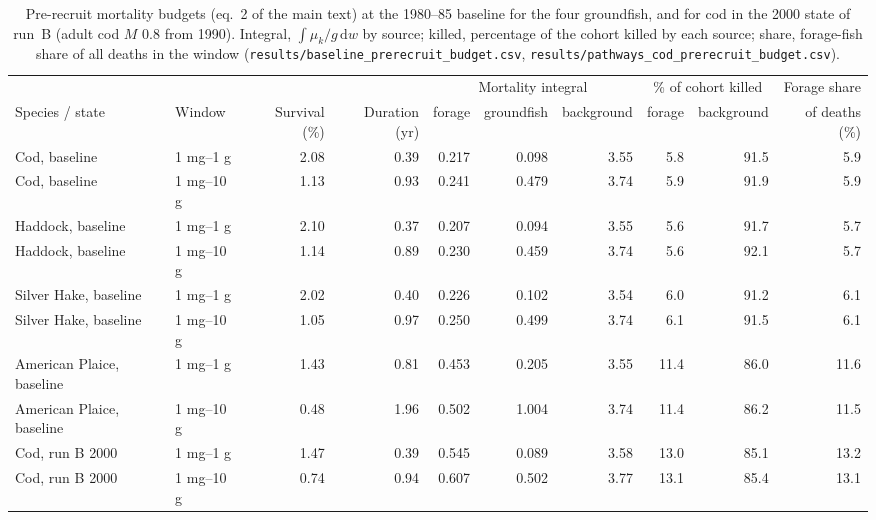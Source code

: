 \documentclass[11pt,letterpaper,fleqn]{article}
\begin{document}
\begin{table}[p]\caption{Pre-recruit mortality budgets (eq.~2 of the main text) at the 1980--85 baseline for the four groundfish, and for cod in the 2000 state of run~B (adult cod $M$ 0.8 from 1990). Integral, $\int\mu_k/g\,\mathrm{d}w$ by source; killed, percentage of the cohort killed by each source; share, forage-fish share of all deaths in the window (\nolinkurl{results/baseline_prerecruit_budget.csv}, \nolinkurl{results/pathways_cod_prerecruit_budget.csv}).}\label{tab:S-budget}
\centering\footnotesize\begin{adjustbox}{max width=\textwidth}\begin{tabular}{@{}llrrrrrrrr@{}}\toprule
 & & & & \multicolumn{3}{c}{Mortality integral} & \multicolumn{2}{c}{\% of cohort killed} & Forage share\\\cmidrule(lr){5-7}\cmidrule(lr){8-9}
Species / state & Window & Survival (\%) & Duration (yr) & forage & groundfish & background & forage & background & of deaths (\%)\\\midrule
Cod, baseline & 1 mg--1 g & 2.08 & 0.39 & 0.217 & 0.098 & 3.55 & 5.8 & 91.5 & 5.9\\
Cod, baseline & 1 mg--10 g & 1.13 & 0.93 & 0.241 & 0.479 & 3.74 & 5.9 & 91.9 & 5.9\\
Haddock, baseline & 1 mg--1 g & 2.10 & 0.37 & 0.207 & 0.094 & 3.55 & 5.6 & 91.7 & 5.7\\
Haddock, baseline & 1 mg--10 g & 1.14 & 0.89 & 0.230 & 0.459 & 3.74 & 5.6 & 92.1 & 5.7\\
Silver Hake, baseline & 1 mg--1 g & 2.02 & 0.40 & 0.226 & 0.102 & 3.54 & 6.0 & 91.2 & 6.1\\
Silver Hake, baseline & 1 mg--10 g & 1.05 & 0.97 & 0.250 & 0.499 & 3.74 & 6.1 & 91.5 & 6.1\\
American Plaice, baseline & 1 mg--1 g & 1.43 & 0.81 & 0.453 & 0.205 & 3.55 & 11.4 & 86.0 & 11.6\\
American Plaice, baseline & 1 mg--10 g & 0.48 & 1.96 & 0.502 & 1.004 & 3.74 & 11.4 & 86.2 & 11.5\\
Cod, run B 2000 & 1 mg--1 g & 1.47 & 0.39 & 0.545 & 0.089 & 3.58 & 13.0 & 85.1 & 13.2\\
Cod, run B 2000 & 1 mg--10 g & 0.74 & 0.94 & 0.607 & 0.502 & 3.77 & 13.1 & 85.4 & 13.1\\
\bottomrule\end{tabular}\end{adjustbox}\end{table}
\end{document}
